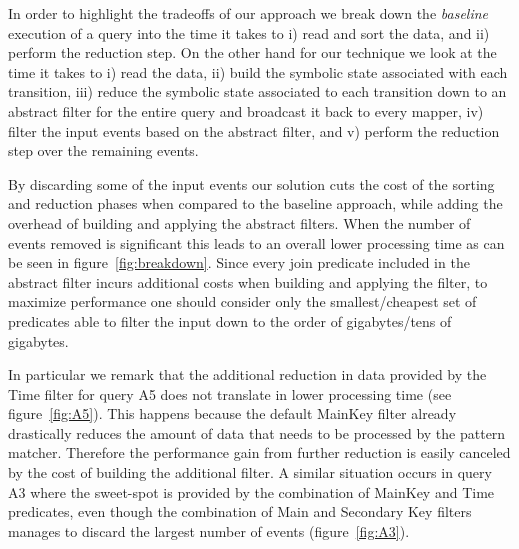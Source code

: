 In order to highlight the tradeoffs of our approach we break down the {\em
baseline} execution of a query into the time it takes to 
i) read and sort the data, and 
ii) perform the reduction step.
On the other hand for our technique we look at the time it takes to 
i) read the data, 
ii) build the symbolic state associated with each transition,
iii) reduce the symbolic state associated to each transition down to an abstract
filter for the entire query and broadcast it back to every mapper,
iv) filter the input events based on the abstract filter, and
v) perform the reduction step over the remaining events. 

By discarding some of the input events our solution cuts the cost
of the sorting and reduction phases when compared to the baseline approach,
while adding the overhead of building and applying the abstract filters.
When the number of events removed is significant this leads to an overall lower
processing time as can be seen in figure~\ref{fig:breakdown}.
Since every join predicate included in the abstract filter incurs additional
costs when building and applying the filter, to maximize performance one should
consider only the smallest/cheapest set of predicates able to filter the input
down to the order of gigabytes/tens of gigabytes.


In particular we remark that the additional reduction in data provided by the
Time filter for query A5 does not translate in lower processing time (see
figure~\ref{fig:A5}).
This happens because the default MainKey filter already drastically reduces
the amount of data that needs to be processed by the pattern matcher. 
Therefore the performance gain from further reduction is easily canceled by the
cost of building the additional filter.
A similar situation occurs in query A3 where the sweet-spot is provided by the
combination of MainKey and Time predicates, even though the combination of
Main and Secondary Key filters manages to discard the largest number of events 
(figure~\ref{fig:A3}).





